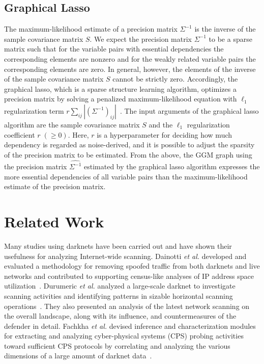 \documentclass[conference]{IEEEtran}
\begin{document}
\subsection{Graphical Lasso}
The maximum-likelihood estimate of a precision matrix $\Sigma^{-1}$ is the inverse of the sample covariance matrix $S$.
We expect the precision matrix $\Sigma^{-1}$ to be a sparse matrix such that for the variable pairs with essential dependencies the corresponding elements are nonzero and for the weakly related variable pairs the corresponding elements are zero.
In general, however, the elements of the inverse of the sample covariance matrix $S$ cannot be strictly zero.
Accordingly, the graphical lasso, which is a sparse structure learning algorithm, optimizes a precision matrix by solving a penalized maximum-likelihood equation with $\ell_1$ regularization term $r\sum_{ij}|(\Sigma^{-1})_{ij}|$~\cite{Friedman}.
The input arguments of the graphical lasso algorithm are the sample covariance matrix $S$ and the $\ell_1$ regularization coefficient $r\;(\geq 0)$.
Here, $r$ is a hyperparameter for deciding how much dependency is regarded as noise-derived, and it is possible to adjust the sparsity of the precision matrix to be estimated.
From the above, the GGM graph using the precision matrix $\hat{\Sigma^{-1}}$ estimated by the graphical lasso algorithm expresses the more essential dependencies of all variable pairs than the maximum-likelihood estimate of the precision matrix.



\section{Related Work}
Many studies using darknets have been carried out and have shown their usefulness for analyzing Internet-wide scanning.
Dainotti \textit{et al.} developed and evaluated a methodology for removing spoofed traffic from both darknets and live networks and contributed to supporting census-like analyses of IP address space utilization~\cite{Dainotti}.
Durumeric \textit{et al.} analyzed a large-scale darknet to investigate scanning activities and identifying patterns in sizable horizontal scanning operations~\cite{Durumeric}.
They also presented an analysis of the latest network scanning on the overall landscape, along with its influence, and countermeasures of the defender in detail.
Fachkha \textit{et al.} devised inference and characterization modules for extracting and analyzing cyber-physical systems (CPS) probing activities toward sufficient CPS protocols by correlating and analyzing the various dimensions of a large amount of darknet data~\cite{Fachkha}.
\end{document}
